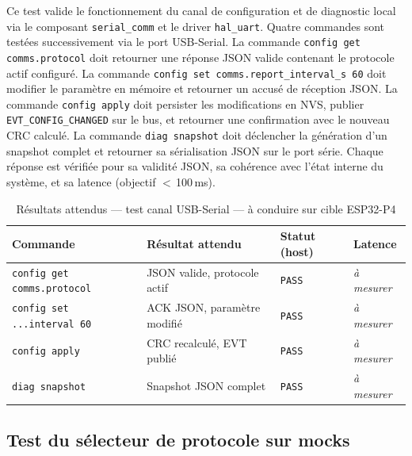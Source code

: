 Ce test valide le fonctionnement du canal de configuration et de
diagnostic local via le composant \texttt{serial\_comm} et le driver
\texttt{hal\_uart}. Quatre commandes sont testées successivement via
le port USB-Serial. La commande \texttt{config get comms.protocol}
doit retourner une réponse JSON valide contenant le protocole actif
configuré. La commande \texttt{config set comms.report\_interval\_s 60}
doit modifier le paramètre en mémoire et retourner un accusé de
réception JSON. La commande \texttt{config apply} doit persister
les modifications en NVS, publier \texttt{EVT\_CONFIG\_CHANGED} sur
le bus, et retourner une confirmation avec le nouveau CRC calculé.
La commande \texttt{diag snapshot} doit déclencher la génération
d'un snapshot complet et retourner sa sérialisation JSON sur le port
série. Chaque réponse est vérifiée pour sa validité JSON, sa cohérence
avec l'état interne du système, et sa latence (objectif $<$\,100\,ms).

\begin{table}[H]
\centering
\renewcommand{\arraystretch}{1.5}
\caption{Résultats attendus — test canal USB-Serial — à conduire sur cible ESP32-P4}
\label{tab:res_canal}
\small
\begin{tabular}{|p{4.5cm}|p{2.5cm}|p{2.0cm}|p{2.0cm}|}
\hline
\rowcolor{gray!20}
\textbf{Commande} & \textbf{Résultat attendu} & \textbf{Statut (host)} & \textbf{Latence} \\
\hline
\texttt{config get comms.protocol} & JSON valide, protocole actif & \texttt{PASS} & \textit{à mesurer} \\
\hline
\texttt{config set ...interval 60}  & ACK JSON, paramètre modifié  & \texttt{PASS} & \textit{à mesurer} \\
\hline
\texttt{config apply}               & CRC recalculé, EVT publié    & \texttt{PASS} & \textit{à mesurer} \\
\hline
\texttt{diag snapshot}              & Snapshot JSON complet        & \texttt{PASS} & \textit{à mesurer} \\
\hline
\end{tabular}
\end{table}

\subsection{Test du sélecteur de protocole sur mocks}
\label{subsec:t_proto}

